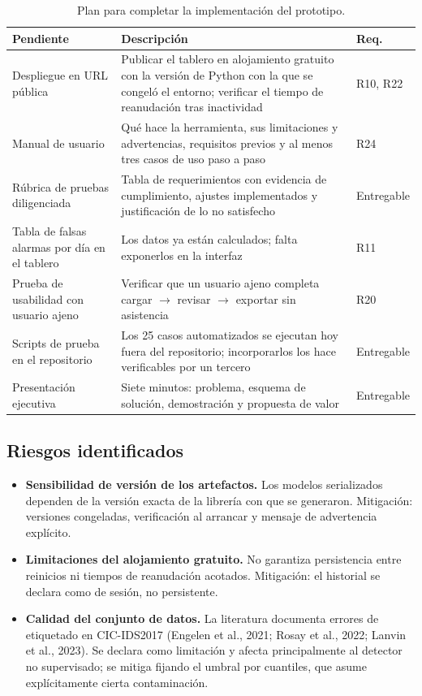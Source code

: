 \documentclass[11pt,a4paper]{article}
\begin{document}
\begin{table}[H]
\centering
\caption{Plan para completar la implementación del prototipo.}
\label{tab:plan}
\footnotesize\setlength{\tabcolsep}{4pt}
\begin{tabular}{L{4.2cm} L{7.4cm} L{2.2cm}}
\toprule
\textbf{Pendiente} & \textbf{Descripción} & \textbf{Req.} \\
\midrule
Despliegue en URL pública & Publicar el tablero en alojamiento gratuito con la versión de Python con la que se congeló el entorno; verificar el tiempo de reanudación tras inactividad & R10, R22 \\
Manual de usuario & Qué hace la herramienta, sus limitaciones y advertencias, requisitos previos y al menos tres casos de uso paso a paso & R24 \\
Rúbrica de pruebas diligenciada & Tabla de requerimientos con evidencia de cumplimiento, ajustes implementados y justificación de lo no satisfecho & Entregable \\
Tabla de falsas alarmas por día en el tablero & Los datos ya están calculados; falta exponerlos en la interfaz & R11 \\
Prueba de usabilidad con usuario ajeno & Verificar que un usuario ajeno completa cargar $\rightarrow$ revisar $\rightarrow$ exportar sin asistencia & R20 \\
Scripts de prueba en el repositorio & Los 25 casos automatizados se ejecutan hoy fuera del repositorio; incorporarlos los hace verificables por un tercero & Entregable \\
Presentación ejecutiva & Siete minutos: problema, esquema de solución, demostración y propuesta de valor & Entregable \\
\bottomrule
\end{tabular}
\end{table}

\subsection{Riesgos identificados}

\begin{itemize}
\item \textbf{Sensibilidad de versión de los artefactos.} Los modelos
serializados dependen de la versión exacta de la librería con que se
generaron. Mitigación: versiones congeladas, verificación al arrancar y
mensaje de advertencia explícito.
\item \textbf{Limitaciones del alojamiento gratuito.} No garantiza
persistencia entre reinicios ni tiempos de reanudación acotados. Mitigación:
el historial se declara como de sesión, no persistente.
\item \textbf{Calidad del conjunto de datos.} La literatura documenta errores
de etiquetado en CIC-IDS2017 (Engelen et al., 2021; Rosay et al., 2022;
Lanvin et al., 2023). Se declara como limitación y afecta
principalmente al detector no supervisado; se mitiga fijando el umbral por
cuantiles, que asume explícitamente cierta contaminación.
\end{itemize}
\end{document}
